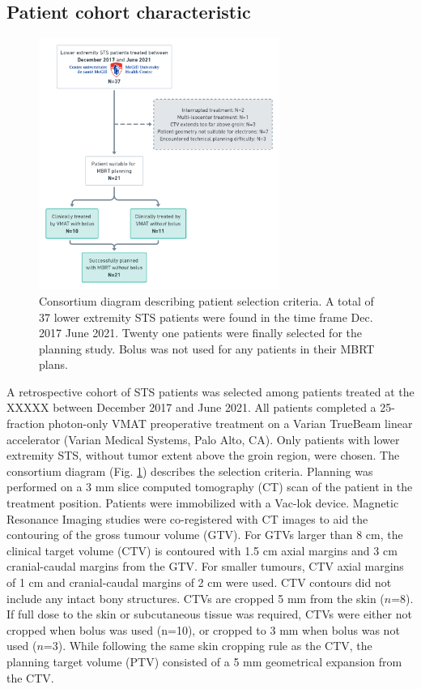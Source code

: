 \documentclass[aapm,graphicx,superscriptaddress]{revtex4-1}
\begin{document}
\subsection{Patient cohort characteristic}

\begin{figure}
    \centering
    \includegraphics[width=0.7\textwidth]{Consortium diagram.png}
    \caption{Consortium diagram describing patient selection criteria. A total of 37 lower extremity STS patients were found in the time frame Dec. 2017 {\textendash} June 2021. Twenty one patients were finally selected for the planning study. Bolus was not used for any patients in their MBRT plans.}
    \label{fig:consortium}
\end{figure}
A retrospective cohort of STS patients was selected among patients treated at the XXXXX %
between December 2017 and June 2021. All patients completed a 25-fraction photon-only VMAT preoperative treatment on a Varian TrueBeam linear accelerator (Varian Medical Systems, Palo
Alto, CA). Only patients with lower extremity STS, without tumor extent above the groin region, were chosen. The consortium diagram (Fig. \ref{fig:consortium}) describes the selection criteria. Planning was performed on a 3 mm slice computed tomography (CT) scan of the patient in the treatment position. Patients were immobilized with a Vac-lok device. Magnetic Resonance Imaging studies were co-registered with CT images to aid the contouring of the gross tumour volume (GTV). For GTVs larger than 8 cm, the clinical target volume (CTV) is contoured with 1.5 cm axial margins and 3 cm cranial-caudal margins from the GTV. For smaller tumours, CTV axial margins of 1 cm and cranial-caudal margins of 2 cm were used. CTV contours did not include any intact bony structures. CTVs are cropped 5 mm from the skin ($n$=8). If full dose to the skin or subcutaneous tissue was required, CTVs were either not cropped when bolus was used (n=10), or cropped to 3 mm when bolus was not used ($n$=3). While following the same skin cropping rule as the CTV, the planning target volume (PTV) consisted of a 5 mm geometrical expansion from the CTV.\\
\end{document}
